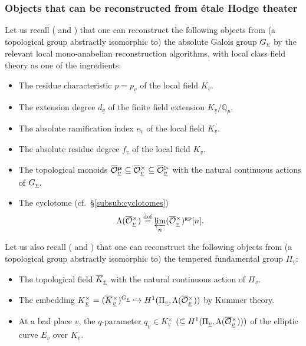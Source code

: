 \documentclass[12pt, reqno, a4paper]{amsart}
\def\udl#1{\underline{#1}} %
\def\eqdef{\stackrel{\textrm{def}}{=}} %
\def\injto{\hookrightarrow}
\def\uv{\udl{v}} %
\def\gp{\mathrm{gp}}
\begin{document}
\subsubsection{Objects that can be reconstructed from \'etale Hodge theater}\label{subsub:ObjectsReconstFromEtHT}
Let us recall (\cite[Prop.\ 1.2(vi)--(ix)]{MR4225475} and \cite[Prop.\ 3.2; Prop.\ 3.3]{MR3445958}) that one can reconstruct the following objects from (a topological group abstractly isomorphic to) the absolute Galois group $\GG_{\uv}$ by the relevant local mono-anabelian reconstruction algorithms, with local class field theory as one of the ingredients:  
\begin{itemize}
\item 
The residue characteristic $p = p_{\uv}$ of the local field $K{}_{\uv}$.  

\item 
The extension degree $d_{\uv}$ of the finite field extension $K{}_{\uv} / \mathbb{Q}_p$.  

\item 
The absolute ramification index $e_{\uv}$ of the local field $K{}_{\uv}$.  

\item 
The absolute residue degree $f_{\uv}$ of the local field $K{}_{\uv}$.  

\item 
The topological monoids $\oOOmu_{\uv} \subseteq \oOOx_{\uv} \subseteq \oOOt_{\uv}$ with the natural continuous actions of $\GG_{\uv}$.  

\item
The cyclotome (cf.\ \S\ref{subsub:cyclotomes})
\[
  \Lambda(\oOOx_{\uv})
  \eqdef
  \varprojlim_n (\oOOx_{\uv})^{\gp}[n].
\]

\end{itemize}
Let us also recall (\cite[Thm.\ 1.6; Thm.\ 1.10; Cor.\ 2.18; Cor.\ 2.19]{MR2512782} and \cite[Prop.\ 1.4]{MR4225474}) that one can reconstruct the following objects from (a topological group abstractly isomorphic to) the tempered fundamental group $\Pi_{\uv}$:  
\begin{itemize}
\item 
The topological field $\oK_{\uv}$ with the natural continuous action of $\Pi_{\uv}$.  

\item 
The embedding $K{}_{\uv}^{\times} = (\oKx_{\uv})^{\GG_{\uv}} \injto H^1(\Pi_{\uv}, \Lambda(\oOOx_{\uv}))$ by Kummer theory.  

\item 
At a bad place $\uv$, the $q$-parameter $q_{\uv} \in K{}_{\uv}^{\times}$ $(\subseteq H^1(\Pi_{\uv}, \Lambda(\oOOx_{\uv})))$ of the elliptic curve $E_{\uv}$ over $K{}_{\uv}$. 
\end{itemize}
\end{document}
